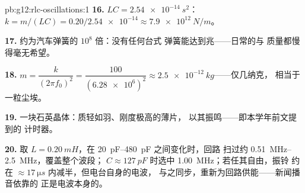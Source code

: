 \begin{solution}{pb:g12:rlc-oscillations:1}
\textbf{16.} $LC = \qty{2.54e-14}{s^2}$：$k = m/(LC) =
0.20/\num{2.54e-14} \approx \qty{7.9e12}{N/m}$。

\textbf{17.} 约为汽车弹簧的 $10^8$ 倍：没有任何台式
弹簧能达到兆——日常的与
质量都慢得毫无希望。

\textbf{18.} $m = \dfrac{k}{(2\pi f_0)^2} = \dfrac{100}
{(\num{6.28e6})^2} \approx \qty{2.5e-12}{kg}$——仅几纳克，
相当于一粒尘埃。

\textbf{19.} 一块石英晶体：质轻如羽、刚度极高的薄片，
以其振鸣——即本学年前文提到的
计时器。

\textbf{20.} 取 $L = \qty{0.20}{mH}$，在 \qtyrange{20}{480}{pF} 之间变化时，回路
扫过约 \qtyrange{0.51}{2.5}{MHz}，覆盖整个波段；
$C \approx \qty{127}{pF}$ 时选中 \qty{1.00}{MHz}；若任其自由，振铃
约在 $\approx \qty{17}{\micro s}$ 内减半，但电台自身的电波，
与之同步，重新为回路供能——新闻播音依靠的
正是电波本身的。
\end{solution}
